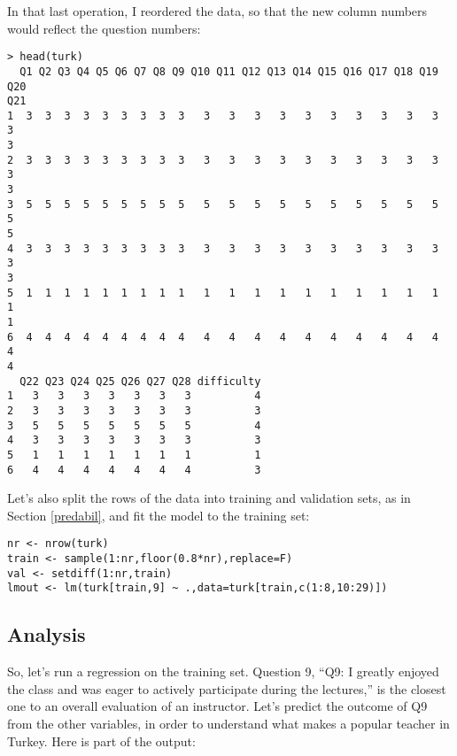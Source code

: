 In that last operation, I reordered the data, so that the new column
numbers would reflect the question numbers:

\begin{lstlisting}
> head(turk)
  Q1 Q2 Q3 Q4 Q5 Q6 Q7 Q8 Q9 Q10 Q11 Q12 Q13 Q14 Q15 Q16 Q17 Q18 Q19 Q20
Q21
1  3  3  3  3  3  3  3  3  3   3   3   3   3   3   3   3   3   3   3   3
3
2  3  3  3  3  3  3  3  3  3   3   3   3   3   3   3   3   3   3   3   3
3
3  5  5  5  5  5  5  5  5  5   5   5   5   5   5   5   5   5   5   5   5
5
4  3  3  3  3  3  3  3  3  3   3   3   3   3   3   3   3   3   3   3   3
3
5  1  1  1  1  1  1  1  1  1   1   1   1   1   1   1   1   1   1   1   1
1
6  4  4  4  4  4  4  4  4  4   4   4   4   4   4   4   4   4   4   4   4
4
  Q22 Q23 Q24 Q25 Q26 Q27 Q28 difficulty
1   3   3   3   3   3   3   3          4
2   3   3   3   3   3   3   3          3
3   5   5   5   5   5   5   5          4
4   3   3   3   3   3   3   3          3
5   1   1   1   1   1   1   1          1
6   4   4   4   4   4   4   4          3
\end{lstlisting}

Let's also split the rows of the data into training and validation sets, as
in Section \ref{predabil}, and fit the model to the training set:

\begin{lstlisting}
nr <- nrow(turk)
train <- sample(1:nr,floor(0.8*nr),replace=F)
val <- setdiff(1:nr,train)
lmout <- lm(turk[train,9] ~ .,data=turk[train,c(1:8,10:29)])
\end{lstlisting}

\subsection{Analysis}

So, let's run a regression on the training set.  Question 9, ``Q9:  I
greatly enjoyed the class and was eager to actively participate during
the lectures,'' is the closest one to an overall evaluation of an
instructor.  Let's predict the outcome of Q9 from the other variables,
in order to understand what makes a popular teacher in Turkey.  Here is
part of the output:

